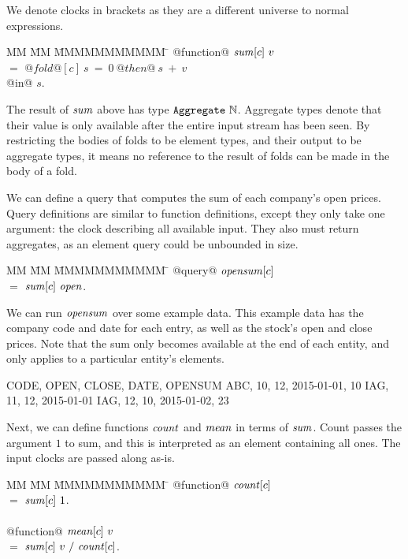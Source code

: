 We denote clocks in brackets as they are a different universe to normal expressions.
\begin{tabbing}
MM \= MM \= MMMMMMMMMMM \= \kill
@function@ 
$\mathit{sum}[c]~v$    \\
\> $=$  \> $@fold@[c]~s~=~0~@then@~s~+~v$ \\
\> @in@ \> $s$. \\
\end{tabbing}

The result of $\mathit{sum}$ above has type $\mathtt{Aggregate}~\mathbb{N}$.
Aggregate types denote that their value is only available after the entire input stream has been seen.
By restricting the bodies of folds to be element types, and their output to be aggregate types, it means no reference to the result of folds can be made in the body of a fold.

We can define a query that computes the sum of each company's open prices.
Query definitions are similar to function definitions, except they only take one argument: the clock describing all available input.
They also must return aggregates, as an element query could be unbounded in size.
\begin{tabbing}
MM \= MM \= MMMMMMMMMMM \= \kill
@query@ 
$\mathit{opensum}[c]$    \\
\> $=$  \> $\mathit{sum}[c]~\mathit{open}$. \\
\end{tabbing}

We can run $\mathit{opensum}$ over some example data.
This example data has the company code and date for each entry, as well as the stock's open and close prices.
Note that the sum only becomes available at the end of each entity, and only applies to a particular entity's elements.

\begin{code}
CODE, OPEN, CLOSE, DATE,        OPENSUM
ABC,    10,    12, 2015-01-01,       10
IAG,    11,    12, 2015-01-01
IAG,    12,    10, 2015-01-02,       23
\end{code}


Next, we can define functions $\mathit{count}$ and $\mathit{mean}$ in terms of $\mathit{sum}$.
Count passes the argument $1$ to sum, and this is interpreted as an element containing all ones.
The input clocks are passed along as-is.
\begin{tabbing}
MM \= MM \= MMMMMMMMMMM \= \kill
@function@ 
$\mathit{count}[c]$                                     \\
 \> $=$  \> $\mathit{sum}[c]~1$.                           \\
                                                    \\
@function@ 
$\mathit{mean}[c]~v$                                       \\
 \> $=$  \> $\mathit{sum}[c]~v~/~\mathit{count}[c]$.              \\
\end{tabbing}

